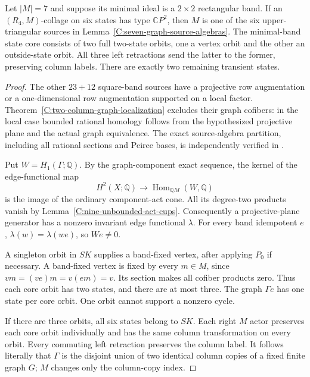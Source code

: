 \begin{lemma}
\label{C:rightzero-three-six-square-core}
Let $|M|=7$ and suppose its minimal ideal is a $2\times2$
rectangular band.  If an $(R_4,M)$-collage on six states has
type $\mathbb CP^2$, then $M$ is one of the six upper-triangular
sources in Lemma~\ref{C:seven-graph-source-algebras}.  The
minimal-band state core consists of two full two-state orbits,
one a vertex orbit and the other an outside-state orbit.  All
three left retractions send the latter to the former, preserving
column labels.  There are exactly two remaining transient states.
\end{lemma}
\begin{proof}
The other $23+12$ square-band sources have a projective row
augmentation or a one-dimensional row augmentation supported on
a local factor.  Theorem~\ref{C:two-column-graph-localization}
excludes their graph cofibers: in the local case bounded rational
homology follows from the hypothesized projective plane and the
actual graph equivalence.  The exact source-algebra partition,
including all rational sections and Peirce bases, is independently
verified in
.

Put $W=H_1(\Gamma;\mathbb Q)$.  By the graph-component exact
sequence, the kernel of the edge-functional map
\[
 H^2(X;\mathbb Q)\longrightarrow
 \operatorname{Hom}_{\mathbb QM}(W,\mathbb Q)
\]
is the image of the ordinary component-act cone.  All its
degree-two products vanish by Lemma~\ref{C:nine-unbounded-act-cups}.
Consequently a projective-plane generator has a nonzero invariant
edge functional $\lambda$.  For every band idempotent $e$,
$\lambda(w)=\lambda(we)$, so $We\ne0$.

A singleton orbit in $SK$ supplies a band-fixed vertex, after
applying $P_0$ if necessary.  A band-fixed vertex is fixed by
every $m\in M$, since $vm=(ve)m=v(em)=v$.  Its section makes
all cofiber products zero.  Thus each core orbit has two states,
and there are at most three.  The graph $\Gamma e$ has one state
per core orbit.  One orbit cannot support a nonzero cycle.

If there are three orbits, all six states belong to $SK$.
Each right $M$ actor preserves each core orbit individually
and has the same column transformation on every orbit.
Every commuting left retraction preserves the column label.
It follows literally that $\Gamma$ is the disjoint union of
two identical column copies of a fixed finite graph $G$;
$M$ changes only the column-copy index.


\end{proof}
